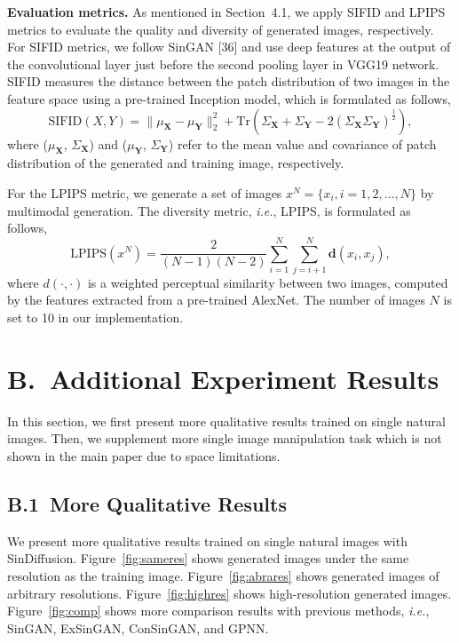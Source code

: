 \documentclass[10pt,twocolumn,letterpaper]{article}
\begin{document}
\vspace{2mm}
\noindent \textbf{Evaluation metrics.}
As mentioned in Section~4.1, we apply SIFID and LPIPS metrics to evaluate the quality and diversity of generated images, respectively.
For SIFID metrics, we follow SinGAN [36] and use deep features at the output of the convolutional layer just before the second pooling layer in VGG19 network.
SIFID measures the distance between the patch distribution of two images in the feature space using a pre-trained Inception model, which is formulated as follows, 
\begin{equation}
    \mathrm{SIFID}(X, Y) = \| \mu_\mathbf{X} - \mu_\mathbf{Y} \|_2^2 + \mathrm{Tr}(\Sigma_\mathbf{X} + \Sigma_\mathbf{Y} - 2(\Sigma_\mathbf{X}\Sigma_\mathbf{Y})^{\frac{1}{2}}),
\end{equation}
where ($\mu_\mathbf{X}$, $\Sigma_\mathbf{X}$) and ($\mu_\mathbf{Y}$, $\Sigma_\mathbf{Y}$) refer to the mean value and covariance of patch distribution of the generated and training image, respectively.

For the LPIPS metric, we generate a set of images $x^N = \{x_i, i=1,2, \dots, N\}$ by multimodal generation. 
The diversity metric, \emph{i.e.}, LPIPS, is formulated as follows,
\begin{equation}
    \mathrm{LPIPS}(x^N) = \frac{2}{(N-1)(N-2)} \sum_{i=1}^N \sum_{j=i+1}^N \mathbf{d}(x_i, x_j),
\end{equation}
where $d(\cdot, \cdot)$ is a weighted perceptual similarity between two images, computed by the features extracted from a pre-trained AlexNet.
The number of images $N$ is set to 10 in our implementation.

\section*{B.~Additional Experiment Results}
In this section, we first present more qualitative results trained on single natural images.
Then, we supplement more single image manipulation task which is not shown in the main paper due to space limitations.

\subsection*{B.1~More Qualitative Results}
We present more qualitative results trained on single natural images with SinDiffusion.
Figure~\ref{fig:sameres} shows generated images under the same resolution as the training image.
Figure~\ref{fig:abrares} shows generated images of arbitrary resolutions.
Figure~\ref{fig:highres} shows high-resolution generated images.
Figure~\ref{fig:comp} shows more comparison results with previous methods, \emph{i.e.}, SinGAN, ExSinGAN, ConSinGAN, and GPNN.
\end{document}
